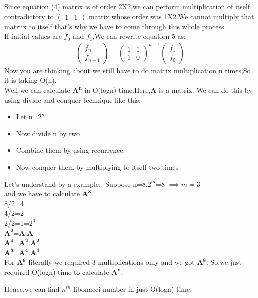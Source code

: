 \documentclass[journal,12pt,twocolumn]{IEEEtran}
\begin{document}
Since equation (4) matrix is of order 2X2,we can perform multiplication of itself contradictory to $\begin{pmatrix}1 & 1\end{pmatrix}$  matrix whose order was 1X2.We cannot multiply that matriix to itself that's why we have to come through this whole process.\\
If initial values are $f_0$ and $f_1$,We can rewrite equation 5 as:-
\begin{align}
      \boxed{\begin{pmatrix}f_n\\f_{n-1}\end{pmatrix}=\begin{pmatrix}1 & 1\\1 & 0\end{pmatrix}^{n-1}\begin{pmatrix}f_1\\f_0\end{pmatrix}}
      \end{align}
Now,you are thinking about we still have to do matrix multiplication n times,So it is taking O(n).\\
Well we can calculate $\mathbf{A^{n}}$ in O(logn) time.Here,$\mathbf{A}$ is a matrix.
We can do this by using divide and conquer technique like this:-
\begin{itemize}
    \item Let n=$2^m$
    \item Now divide n by two
    \item Combine them by using recurrence.
    \item Now conquer them by multiplying to itself two times
\end{itemize}
Let's understand by a example:-
Suppose n=8,$2^m$=8 $\implies m=3$\\ and we have to calculate $\mathbf{A^8}$\\
8/2=4\\
4/2=2\\
2/2=1=$2^0$\\
$\mathbf{A^2}$=$\mathbf{A}$.$\mathbf{A}$\\
$\mathbf{A^4}$=$\mathbf{A^2}$.$\mathbf{A^2}$\\
$\mathbf{A^8}$=$\mathbf{A^4}$.$\mathbf{A^4}$\\
For $\mathbf{A^8}$ literally we required 3 multiplications only and we got $\mathbf{A^8}$.
So,we just required O(logn) time to calculate $\mathbf{A^n}$.

Hence,we can find $n^{th}$ fibonacci number in just O(logn) time.
\end{document}
